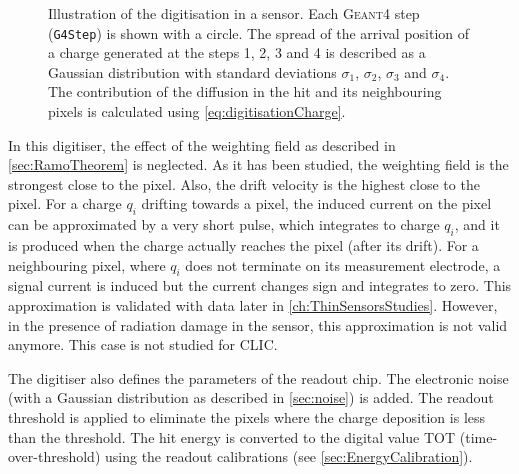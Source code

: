 \begin{figure}[htbp]
  \caption{Illustration of the digitisation in a sensor. Each
    \textsc{Geant4} step (\texttt{G4Step}) is shown with a circle. The
    spread of the arrival position of a charge generated at the steps
    1, 2, 3 and 4 is described as a Gaussian distribution with
    standard deviations $\sigma_1$, $\sigma_2$, $\sigma_3$ and
    $\sigma_4$. The contribution of the diffusion in the hit and its
    neighbouring pixels is calculated using
    \cref{eq:digitisationCharge}.}
  \label{fig:digitisation}
\end{figure}

In this digitiser, the effect of the weighting field as described in
\cref{sec:RamoTheorem} is neglected. As it has been studied, the
weighting field is the strongest close to the pixel. Also, the drift
velocity is the highest close to the pixel. For a charge $q_i$
drifting towards a pixel, the induced current on the pixel can be
approximated by a very short pulse, which integrates to charge $q_i$,
and it is produced when the charge actually reaches the pixel (after
its drift). For a neighbouring pixel, where $q_i$ does not terminate
on its measurement electrode, a signal current is induced but the
current changes sign and integrates to zero. This approximation is
validated with data later in \cref{ch:ThinSensorsStudies}. However, in
the presence of radiation damage in the sensor, this approximation is
not valid anymore. This case is not studied for CLIC.

The digitiser also defines the parameters of the readout chip. The
electronic noise (with a Gaussian distribution as described in
\cref{sec:noise}) is added. The readout threshold is applied to
eliminate the pixels where the charge deposition is less than the
threshold. The hit energy is converted to the digital value TOT
(time-over-threshold) using the readout calibrations (see
\cref{sec:EnergyCalibration}).


